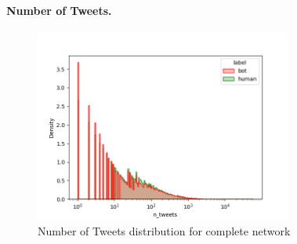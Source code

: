 \documentclass[12pt, a4paper]{article}
\begin{document}
        \paragraph{Number of Tweets.}
        \begin{figure}[H]
        	\centering
        	\includegraphics[width=0.75\textwidth]{complete_n_tweets.png}
            \caption{Number of Tweets distribution for complete network}
      	\end{figure}
\end{document}
